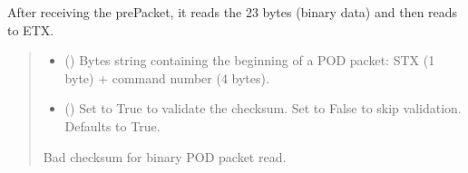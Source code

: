 \documentclass[letterpaper,10pt,english]{sphinxmanual}
\begin{document}
\begin{fulllineitems}
\begin{fulllineitems}
\label{\detokenize{PodDevice_8401HR:PodDevice_8401HR.POD_8401HR._Read_Binary}}
\pysigstartsignatures
{}
\pysigstopsignatures
\sphinxAtStartPar
After receiving the prePacket, it reads the 23 bytes (binary data) and then reads to ETX.
\begin{quote}\begin{description}
\begin{itemize}
\item {} 
\sphinxAtStartPar
{} () \textendash{} Bytes string containing the beginning of a POD packet: STX (1 byte)                 + command number (4 bytes).

\item {} 
\sphinxAtStartPar
{} (\sphinxstyleliteralemphasis{\sphinxupquote{, }}) \textendash{} Set to True to validate the checksum. Set to False to                 skip validation. Defaults to True.

\end{itemize}

\sphinxAtStartPar
{} \textendash{} Bad checksum for binary POD packet read.

\end{description}\end{quote}

\end{fulllineitems}



\end{fulllineitems}
\end{document}
